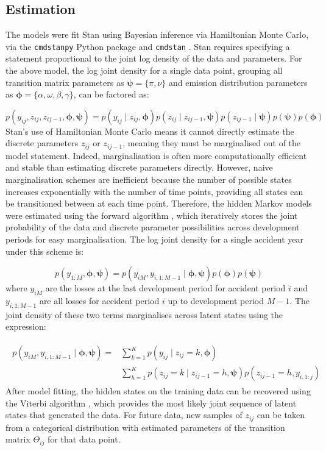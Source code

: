 \subsection{Estimation}
The models were fit Stan \citep{stan2017} using Bayesian inference
via Hamiltonian Monte Carlo, via the \texttt{cmdstanpy} \citep{cmdstanpy2024}
Python package and \texttt{cmdstan} \citep{cmdstan2024}. Stan requires specifying a statement
proportional to the joint log density of the data and parameters.
For the above model, the log joint density for a single data point,
grouping all transition matrix parameters as $\bm{\psi} = \{\pi, \nu\}$
and emission distribution parameters as $\bm{\phi} = \{\alpha,
\omega, \beta, \gamma\}$, can be factored as:

\begin{equation}
p(y_{ij}, z_{ij}, z_{ij-1}, \bm{\phi}, \bm{\psi}) = 
    p(y_{ij} \mid  z_{ij}, \bm{\phi})
    p(z_{ij} \mid z_{ij-1}, \bm{\psi})
    p(z_{ij-1} \mid \bm{\psi})
    p(\bm{\psi})
    p(\bm{\phi})
\end{equation}
%
Stan's use of Hamiltonian Monte Carlo means it cannot
directly estimate the discrete parameters 
$z_{ij}$ or $z_{ij-1}$, meaning they
must be marginalised out of the model statement.
Indeed, marginalisation is often more computationally
efficient and stable than estimating discrete parameters
directly.
However, naive marginalisation schemes are inefficient
because the number of possible states increases
exponentially with the number of time points,
providing all states can be transitioned between
at each time point. Therefore, the hidden Markov
models were estimated using the forward algorithm
\cite{rabiner1989},
which iteratively stores the joint probability
of the data and discrete parameter possibilities
across development periods for easy marginalisation. 
The log joint density for a single accident year under
this scheme is:

\begin{equation}
    p(y_{1:M}, \bm{\phi}, \bm{\psi}) = p(y_{iM}, y_{i,1:M-1} \mid \bm{\phi}, \bm{\psi})
    p(\bm{\phi}) p(\bm{\psi})
\end{equation}
%
where $y_{iM}$ are the losses at the
last development period for accident period $i$
and $y_{i,1:M-1}$ are all losses for accident period $i$ up to 
development period $M - 1$. The joint
density of these two terms marginalises
across latent states using the expression:

\begin{align}
    \begin{split}
        p(y_{iM}, y_{i,1:M-1} \mid \bm{\phi}, \bm{\psi}) =
        &\sum_{k=1}^{K} p(y_{ij} \mid z_{ij} = k, \bm{\phi})\\
        &\sum_{h=1}^{K} p(z_{ij} = k \mid z_{ij-1} = h, \bm{\psi})
            p(z_{ij - 1} = h, y_{i, 1:j})
    \end{split}
\end{align}
%
After model fitting, the hidden states on the
training data can be recovered using the
Viterbi algorithm \citep{rabiner1989},
which provides the most likely joint
sequence of latent states that generated
the data. For future data, new samples of
$z_{ij}$ can be taken from a categorical
distribution with estimated parameters of
the transition matrix $\Theta_{ij}$ for
that data point.
